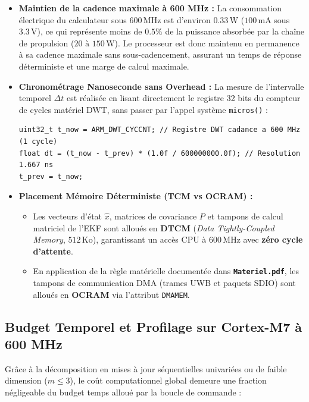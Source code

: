 \documentclass[../Implementation.tex]{subfiles}
\begin{document}
\begin{itemize}
    \item \textbf{Maintien de la cadence maximale à 600 MHz :}
    La consommation électrique du calculateur sous $600\,\text{MHz}$ est d'environ $0.33\,\text{W}$ ($100\,\text{mA}$ sous $3.3\,\text{V}$), ce qui représente moins de $0.5\%$ de la puissance absorbée par la chaîne de propulsion ($20\text{ à }150\,\text{W}$). Le processeur est donc maintenu en permanence à sa cadence maximale sans sous-cadencement, assurant un temps de réponse déterministe et une marge de calcul maximale.
    
    \item \textbf{Chronométrage Nanoseconde sans Overhead :}
    La mesure de l'intervalle temporel $\Delta t$ est réalisée en lisant directement le registre 32 bits du compteur de cycles matériel DWT, sans passer par l'appel système \lstinline|micros()| :
\begin{lstlisting}
uint32_t t_now = ARM_DWT_CYCCNT; // Registre DWT cadance a 600 MHz (1 cycle)
float dt = (t_now - t_prev) * (1.0f / 600000000.0f); // Resolution 1.667 ns
t_prev = t_now;
\end{lstlisting}

    \item \textbf{Placement Mémoire Déterministe (TCM vs OCRAM) :}
    \begin{itemize}
        \item Les vecteurs d'état $\hat{x}$, matrices de covariance $P$ et tampons de calcul matriciel de l'EKF sont alloués en \textbf{DTCM} (\textit{Data Tightly-Coupled Memory}, $512\,\text{Ko}$), garantissant un accès CPU à $600\,\text{MHz}$ avec \textbf{zéro cycle d'attente}.
        \item En application de la règle matérielle documentée dans \textbf{\texttt{Materiel.pdf}}, les tampons de communication DMA (trames UWB et paquets SDIO) sont alloués en \textbf{OCRAM} via l'attribut \lstinline|DMAMEM|.
    \end{itemize}
\end{itemize}

\subsection{Budget Temporel et Profilage sur Cortex-M7 à 600 MHz}

Grâce à la décomposition en mises à jour séquentielles univariées ou de faible dimension ($m \le 3$), le coût computationnel global demeure une fraction négligeable du budget temps alloué par la boucle de commande :
\end{document}

